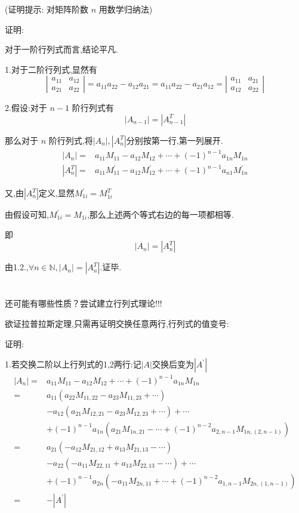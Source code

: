 \documentclass[]{ctexart}
\begin{document}
(证明提示: 对矩阵阶数 $n$ 用数学归纳法)


\noindent 证明:

对于一阶行列式而言,结论平凡.

1.对于二阶行列式,显然有
$$
\left|\begin{array}{ll}
	a_{11} & a_{12} \\
	a_{21} & a_{22}
\end{array}\right|
=a_{11} a_{22}-a_{12} a_{21}
=a_{11} a_{22}-a_{21} a_{12}
=
\left|\begin{array}{ll}
	a_{11} & a_{21} \\
	a_{12} & a_{22}
\end{array}\right|
$$

2.假设:对于 $n-1$ 阶行列式有
$$
\left|A_{n-1}\right|=\left|A_{n-1}^{T}\right|
$$

那么对于 $n$ 阶行列式,将$\left|A_{n}\right|,\left|A^{T}_{n}\right|$分别按第一行,第一列展开.
$$
\begin{aligned}
	\left|A_{n}\right|=&a_{11} M_{11}-a_{12} M_{12}+\cdots+(-1)^{n-1} a_{1 n} M_{1 n} \\
	\left|A^{T}_{n}\right|=&a_{11} M^{'}_{11}-a_{12} M^{'}_{12}+\cdots+(-1)^{n-1} a_{n 1} M^{'}_{1 n}
\end{aligned}
$$

又,由$\left|A^{T}_{n}\right|$定义,显然$M^{'}_{1i}=M_{1i}^{T}$

由假设可知,$M^{'}_{1i}=M_{1i}$,那么上述两个等式右边的每一项都相等.

即
$$
\left|A_{n}\right|=\left|A^{T}_{n}\right|
$$

由1.2.,$\forall n \in \mathbb{N},\left|A_{n}\right|=\left|A^{T}_{n}\right|.$证毕.
\section*{}
\newpage
还可能有哪些性质？尝试建立行列式理论!!!

欲证拉普拉斯定理,只需再证明交换任意两行,行列式的值变号:

\noindent 证明:

1.若交换二阶以上行列式的1,2两行:记$\left| A\right|$交换后变为$\left| A^{'}\right|$
$$
\begin{aligned}
	\left|A_{n}\right|=&a_{11} M_{11}-a_{12} M_{12}+\cdots+(-1)^{n-1} a_{1 n} M_{1 n} \\
	=&a_{11}\left( a_{22}M_{11,22}-a_{23}M_{11,23}+\cdots\right)\\
	&-a_{12}\left( a_{21}M_{12,21}-a_{23}M_{12,23}+\cdots\right)+\cdots\\
	&+(-1)^{n-1} a_{1n} \left( a_{21}M_{1n,21}-\cdots+(-1)^{n-2}a_{2,n-1}M_{1n,\left(2,n-1\right)}\right)\\
	=&a_{21}\left( -a_{12}M_{21,12}+a_{13}M_{21,13}-\cdots\right)\\
	&-a_{22}\left( -a_{11}M_{22,11}+a_{13}M_{22,13}-\cdots\right)+\cdots\\
	&+(-1)^{n-1} a_{2n} \left( -a_{11}M_{2n,11}+\cdots+(-1)^{n-2}a_{1,n-1}M_{2n,\left(1,n-1\right)}\right)\\
	=&-\left| A^{'}\right|
\end{aligned}
$$
\end{document}
